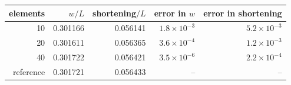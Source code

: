 \begin{tabular}{rrrrr}
\toprule
elements & $w/L$ & shortening$/L$ & error in $w$ & error in shortening \\
\midrule
10 & 0.301166 & 0.056141 & $1.8\times10^{-3}$ & $5.2\times10^{-3}$ \\
20 & 0.301611 & 0.056365 & $3.6\times10^{-4}$ & $1.2\times10^{-3}$ \\
40 & 0.301722 & 0.056421 & $3.5\times10^{-6}$ & $2.2\times10^{-4}$ \\
reference & 0.301721 & 0.056433 & -- & -- \\
\bottomrule
\end{tabular}
